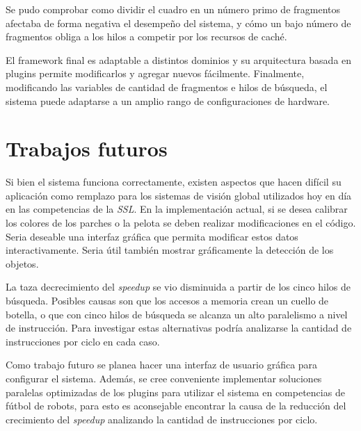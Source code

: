 Se pudo comprobar como dividir el cuadro en un número primo de fragmentos
afectaba de forma negativa el desempeño del sistema, y cómo un bajo número de
fragmentos obliga a los hilos a competir por los recursos de caché.

El framework final es adaptable a distintos dominios y su arquitectura basada en
plugins permite modificarlos y agregar nuevos fácilmente. Finalmente,
modificando las variables de cantidad de fragmentos e hilos de búsqueda, el
sistema puede adaptarse a un amplio rango de configuraciones de hardware.

\section{Trabajos futuros}

\label{trabajosFuturos}

Si bien el sistema funciona correctamente, existen aspectos que hacen difícil su
aplicación como remplazo para los sistemas de visión global utilizados hoy en
día en las competencias de la \emph{SSL}. En la implementación actual, si se
desea calibrar los colores de los parches o la pelota se deben realizar
modificaciones en el código. Seria deseable una interfaz gráfica que permita
modificar estos datos interactivamente. Seria útil también mostrar gráficamente
la detección de los objetos.

La taza decrecimiento del \emph{speedup} se vio disminuida a partir de los cinco
hilos de búsqueda. Posibles causas son que los accesos a memoria crean un cuello
de botella, o que con cinco hilos de búsqueda se alcanza un alto paralelismo a
nivel de instrucción. Para investigar estas alternativas podría analizarse la
cantidad de instrucciones por ciclo en cada caso.

Como trabajo futuro se planea hacer una interfaz de usuario gráfica para
configurar el sistema. Además, se cree conveniente implementar soluciones
paralelas optimizadas de los plugins para utilizar el sistema en competencias de
fútbol de robots, para esto es aconsejable encontrar la causa de la reducción
del crecimiento del \emph{speedup} analizando la cantidad de instrucciones por
ciclo.
